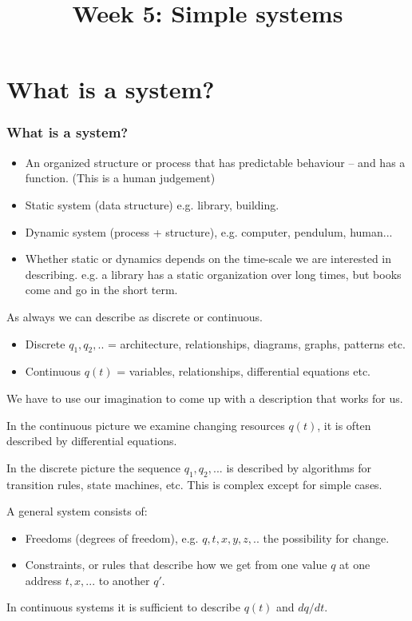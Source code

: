 \documentclass[12pt]{beamer}
\title{Week 5: Simple systems}
\begin{document}
\frame{\titlepage}



\section{What is a system?}

%

\frame
{
\frametitle{What is a system?}

\begin{itemize}
\item An organized structure or process that has predictable behaviour -- and
has a function. (This is a human judgement)

\item Static system (data structure) e.g. library, building.

\item Dynamic system (process + structure), e.g. computer, pendulum, human...

\item Whether static or dynamics depends on the time-scale we are interested in
describing. e.g. a library has a static organization over long times, but books
come and go in the short term.
\end{itemize}
}

\frame
{
As always we can describe as discrete or continuous.
\begin{itemize}
\item Discrete $q_1,q_2,..$ = architecture, relationships, diagrams, graphs, patterns etc.
\item Continuous $q(t)$ = variables, relationships, differential equations etc.
\end{itemize}
We have to use our imagination to come up with a description that works for us.
}


\frame
{
In the continuous picture we examine changing resources $q(t)$, it is often described
by differential equations.

In the discrete picture the sequence $q_1,q_2,...$ is described by
algorithms for transition rules, state machines, etc. This is complex except for
simple cases.

A general system consists of:
\begin{itemize}
\item Freedoms (degrees of freedom), e.g. $q,t,x,y,z,..$ the possibility for change.
\item Constraints, or rules that describe how we get from one value $q$ at one address $t,x,...$ to another $q'$.
\end{itemize}
In continuous systems it is sufficient to describe $q(t)$ and $dq/dt$. 
}
\end{document}

